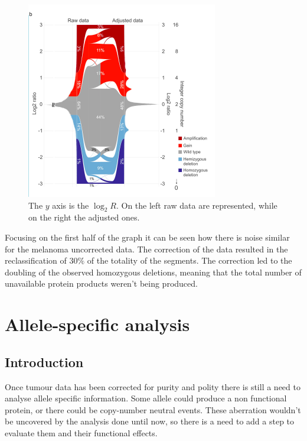     \begin{figure}[H]
        \centering
        \includegraphics[width=0.5\linewidth]{image10.png}
        \caption{The $y$ axis is the $\log_2 R$. On the left raw data are represented, while on the right the adjusted ones.}
        \label{fig:ploidy_tcga}
    \end{figure}

    Focusing on the first half of the graph it can be seen how there is noise similar for the melanoma uncorrected data.
    The correction of the data resulted in the reclassification of $30\%$ of the totality of the segments.
    The correction led to the doubling of the observed homozygous deletions, meaning that the total number of unavailable protein products weren't being produced.

\section{Allele-specific analysis}

  \subsection{Introduction}
  Once tumour data has been corrected for purity and polity there is still a need to analyse allele specific information.
  Some allele could produce a non functional protein, or there could be copy-number neutral events.
  These aberration wouldn't be uncovered by the analysis done until now, so there is a need to add a step to evaluate them and their functional effects.

